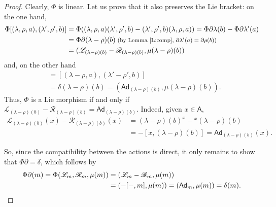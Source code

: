 \documentclass[12pt,reqno]{amsart}
\theoremstyle{plain}
\theoremstyle{definition}
\theoremstyle{remark}
\newcommand{\A}{\ensuremath{\mathsf{A}}}
\newcommand{\Ad}{\ensuremath{\mathsf{Ad}}}
\newcommand{\LL}{\ensuremath{\mathcal{L}}}
\newcommand{\RR}{\ensuremath{\mathcal{R}}}
\numberwithin{equation}{section}
\begin{document}
\begin{proof}
		
		Clearly, $\Phi$ is linear. Let us prove that it also preserves the Lie bracket: on the one hand,
		\begin{align*}
			\Phi[(\lambda,\rho,a),(\lambda',\rho',b)]&=\Phi((\lambda,\rho,a)(\lambda',\rho',b)-(\lambda',\rho',b)(\lambda,\rho,a))
			=\Phi\partial\lambda(b)-\Phi\partial\lambda'(a)\\
			&=\Phi\partial(\lambda-\rho)(b)\;\text{\footnotesize(by Lemma~\ref{L:comp}, $\partial\lambda'(a)=\partial\rho(b)$)}\\
			&=(\LL_{(\lambda-\rho)(b)}-\RR_{(\lambda-\rho)(b)},\mu(\lambda-\rho)(b))
		\end{align*}
		and, on the other hand
		\begin{align*}
			[\Phi(\lambda,\rho,a),\Phi(\lambda',\rho',b)]&=[(\lambda-\rho,a),(\lambda'-\rho',b)]\\
			&=\delta(\lambda-\rho)(b)=(\Ad_{(\lambda-\rho)(b)},\mu(\lambda-\rho)(b)).
		\end{align*}
		Thus, $\Phi$ is a Lie morphism if and only if $\LL_{(\lambda-\rho)(b)}-\RR_{(\lambda-\rho)(b)}=\Ad_{(\lambda-\rho)(b)}$. Indeed, given $x\in\A$,
		\begin{align*}
			\LL_{(\lambda-\rho)(b)}(x)-\RR_{(\lambda-\rho)(b)}(x)&=(\lambda-\rho)(b)^x-{}^{x}(\lambda-\rho)(b)\\
			&=-[x,(\lambda-\rho)(b)]=\Ad_{(\lambda-\rho)(b)}(x).
		\end{align*}
		
		So, since the compatibility between the actions is direct, it only remains to show that $\Phi\partial=\delta$, which follows by
		\begin{align*}
			\Phi\partial(m)=\Phi(\LL_m,\RR_m,\mu(m))&=(\LL_m-\RR_m,\mu(m))\\
			&=(-[-,m],\mu(m))=(\Ad_{m},\mu(m))=\delta(m).\qedhere
		\end{align*}
	\end{proof}
\end{document}
